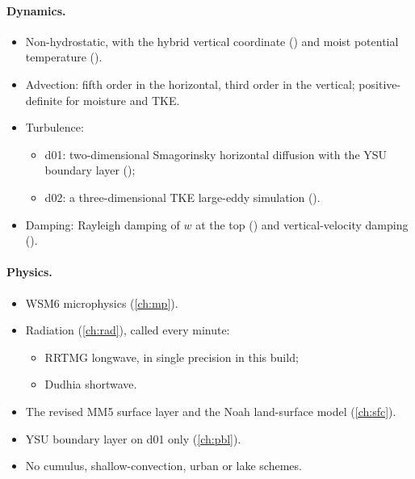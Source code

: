 \paragraph{Dynamics.}
\begin{itemize}
  \item Non-hydrostatic, with the hybrid vertical coordinate () and moist potential
    temperature ().
  \item Advection: fifth order in the horizontal, third order in the vertical; positive-definite for moisture and
    TKE.
  \item Turbulence:
    \begin{itemize}
      \item d01: two-dimensional Smagorinsky horizontal diffusion with the YSU boundary layer
        ();
      \item d02: a three-dimensional TKE large-eddy simulation ().
    \end{itemize}
  \item Damping: Rayleigh damping of $w$ at the top () and vertical-velocity damping
    ().
\end{itemize}

\paragraph{Physics.}
\begin{itemize}
  \item WSM6 microphysics (\cref{ch:mp}).
  \item Radiation (\cref{ch:rad}), called every minute:
    \begin{itemize}
      \item RRTMG longwave, in single precision in this build;
      \item Dudhia shortwave.
    \end{itemize}
  \item The revised MM5 surface layer and the Noah land-surface model (\cref{ch:sfc}).
  \item YSU boundary layer on d01 only (\cref{ch:pbl}).
  \item No cumulus, shallow-convection, urban or lake schemes.
\end{itemize}


